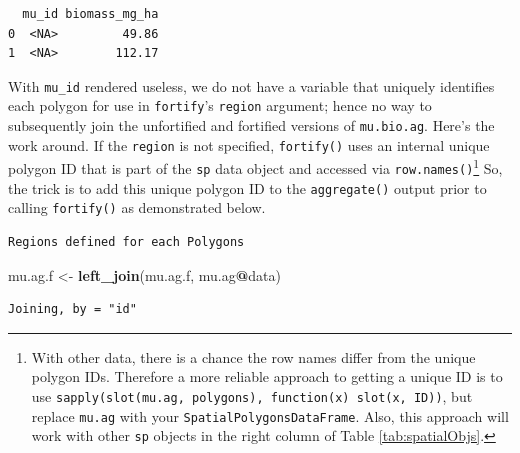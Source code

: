 \documentclass[
]{krantz}
\makeatletter
\newenvironment{Shaded}{\begin{snugshade}}{\end{snugshade}}
\newcommand{\KeywordTok}[1]{\textcolor[rgb]{0.27,0.27,0.27}{\textbf{#1}}}
\newcommand{\NormalTok}[1]{#1}
\newcommand{\OperatorTok}[1]{\textcolor[rgb]{0.43,0.43,0.43}{\textbf{#1}}}
\newcommand{\StringTok}[1]{\textcolor[rgb]{0.5,0.5,0.5}{#1}}
\newenvironment{kframe}{%
\medskip{}
\setlength{\fboxsep}{.8em}
 \def\at@end@of@kframe{}%
 \ifinner\ifhmode%
  \def\at@end@of@kframe{\end{minipage}}%
  \begin{minipage}{\columnwidth}%
 \fi\fi%
 \def\FrameCommand##1{\hskip\@totalleftmargin \hskip-\fboxsep
 \colorbox{shadecolor}{##1}\hskip-\fboxsep
     \hskip-\linewidth \hskip-\@totalleftmargin \hskip\columnwidth}%
 \MakeFramed {\advance\hsize-\width
   \@totalleftmargin\z@ \linewidth\hsize
   \@setminipage}}%
 {\par\unskip\endMakeFramed%
 \at@end@of@kframe}
\renewenvironment{Shaded}{\begin{kframe}}{\end{kframe}}
\makeatother
\begin{document}
\begin{verbatim}
  mu_id biomass_mg_ha
0  <NA>         49.86
1  <NA>        112.17
\end{verbatim}

With \texttt{mu\_id} rendered useless, we do not have a variable that uniquely identifies each polygon for use in \texttt{fortify}'s \texttt{region} argument; hence no way to subsequently join the unfortified and fortified versions of \texttt{mu.bio.ag}. Here's the work around. If the \texttt{region} is not specified, \texttt{fortify()} uses an internal unique polygon ID that is part of the \texttt{sp} data object and accessed via \texttt{row.names()}\footnote{With other data, there is a chance the row names differ from the unique polygon IDs. Therefore a more reliable approach to getting a unique ID is to use \texttt{sapply(slot(mu.ag,\ \textquotesingle{}polygons\textquotesingle{}),\ function(x)\ slot(x,\ \textquotesingle{}ID\textquotesingle{}))}, but replace \texttt{mu.ag} with your \texttt{SpatialPolygonsDataFrame}. Also, this approach will work with other \texttt{sp} objects in the right column of Table \ref{tab:spatialObjs}.} So, the trick is to add this unique polygon ID to the \texttt{aggregate()} output prior to calling \texttt{fortify()} as demonstrated below.

\begin{Shaded}
\end{Shaded}

\begin{verbatim}
Regions defined for each Polygons
\end{verbatim}

\begin{Shaded}
\begin{Highlighting}[]
\NormalTok{mu.ag.f \textless{}{-}}\StringTok{ }\KeywordTok{left\_join}\NormalTok{(mu.ag.f, mu.ag}\OperatorTok{@}\NormalTok{data)}
\end{Highlighting}
\end{Shaded}

\begin{verbatim}
Joining, by = "id"
\end{verbatim}
\end{document}
